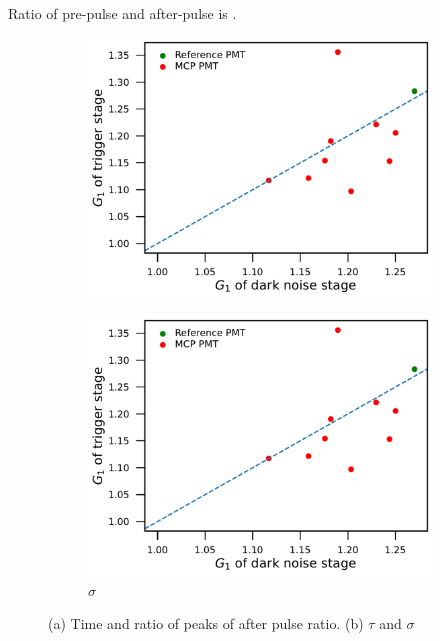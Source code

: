 Ratio of pre-pulse and after-pulse is .
\begin{figure}[!htbp]
    \centering
    \begin{subfigure}[b]{0.49\textwidth}
        \includegraphics[width=\textwidth,page=13]{figures/result/compare.pdf}
        \caption{}
        \label{fig:afterpulsePeak}
    \end{subfigure}
    \begin{subfigure}[b]{0.49\textwidth}
        \includegraphics[width=\textwidth,page=12]{figures/result/compare.pdf}
        \caption{$\sigma$}
        \label{fig:sigmaCompare}
    \end{subfigure}
    \caption{(a) Time and ratio of peaks of after pulse ratio. (b) $\tau$ and $\sigma$}
\end{figure}

